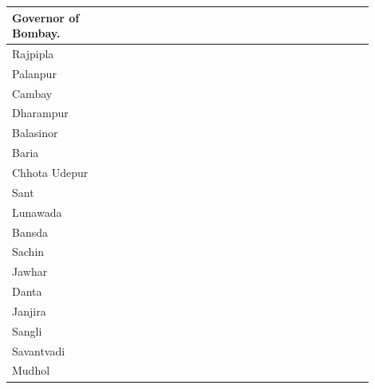 \begin{longtable}{|p{0.30\linewidth}|p{0.30\linewidth}|p{0.30\linewidth}|}
{Governor of Bombay.









































} \\
\hline
Rajpipla

 \\
\hline
Palanpur

 \\
\hline
Cambay

 \\
\hline
Dharampur

 \\
\hline
Balasinor

 \\
\hline
Baria

 \\
\hline
Chhota Udepur

 \\
\hline
Sant

 \\
\hline
Lunawada

 \\
\hline
Bansda

 \\
\hline
Sachin

 \\
\hline
Jawhar

 \\
\hline
Danta

 \\
\hline
Janjira

 \\
\hline
Sangli

 \\
\hline
Savantvadi

 \\
\hline
Mudhol


\end{longtable}
